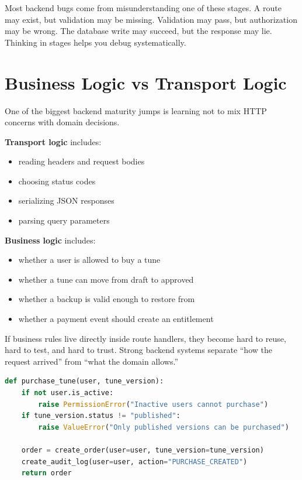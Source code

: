 \documentclass[12pt, a4paper, oneside]{book}
\begin{document}
\begin{notebox}
Most backend bugs come from misunderstanding one of these stages. A route may exist, but validation may be missing. Validation may pass, but authorization may be wrong. The database write may succeed, but the response may lie. Thinking in stages helps you debug systematically.
\end{notebox}

\section{Business Logic vs Transport Logic}

One of the biggest backend maturity jumps is learning not to mix HTTP concerns with domain decisions.

\textbf{Transport logic} includes:
\begin{itemize}[leftmargin=2em]
    \item reading headers and request bodies
    \item choosing status codes
    \item serializing JSON responses
    \item parsing query parameters
\end{itemize}

\textbf{Business logic} includes:
\begin{itemize}[leftmargin=2em]
    \item whether a user is allowed to buy a tune
    \item whether a tune can move from draft to approved
    \item whether a backup is valid enough to restore from
    \item whether a payment event should create an entitlement
\end{itemize}

\begin{intuitionbox}
If business rules live directly inside route handlers, they become hard to reuse, hard to test, and hard to trust. Strong backend systems separate ``how the request arrived'' from ``what the domain allows.''
\end{intuitionbox}

\begin{lstlisting}[language=Python, caption={A service-layer mental model}]
def purchase_tune(user, tune_version):
    if not user.is_active:
        raise PermissionError("Inactive users cannot purchase")
    if tune_version.status != "published":
        raise ValueError("Only published versions can be purchased")

    order = create_order(user=user, tune_version=tune_version)
    create_audit_log(user=user, action="PURCHASE_CREATED")
    return order
\end{lstlisting}
\end{document}
